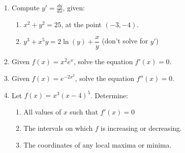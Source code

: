 \documentclass[12pt]{article}
\begin{document}
\begin{enumerate}
    \item Compute $y'=\frac{dy}{dx}$, given:
    \begin{multicols}{2}
    \begin{enumerate}
    \item $x^2+y^2=25$, at the point $(-3,-4)$.
    

    
    \item $y^3+x^5y=2\ln(y)+\dfrac{x}{y}$ (don't solve for $y'$)
    \end{enumerate}
    \end{multicols}
    
    \vspace{2cm}
    
    \newpage
  
    \item Given $f(x) = x^2e^x$, solve the equation $f'(x)=0$.
    
    \vspace{4cm}
    
    \item Given $f(x) = e^{-2x^2}$, solve the equation $f''(x)=0$.

 \vspace{3cm}
  
   \item Let $f(x) = x^3(x-4)^5$. Determine:
   \begin{enumerate}
   \item All values of $x$ such that $f'(x)=0$
   
   \vspace{3cm}
   
   \item The intervals on which $f$ is increasing or decreasing.
   
   \vspace{1.5cm}
   
   \item The coordinates of any local maxima or minima.
   \end{enumerate}
   

   
   
  \end{enumerate}
\end{document}
